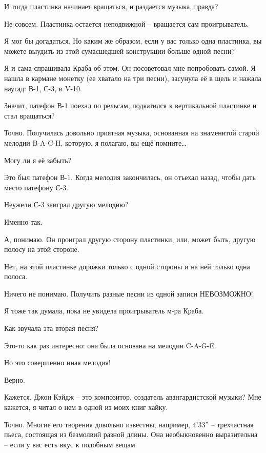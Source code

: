\documentclass[../main.tex]{subfiles}
\begin{document}
\begin{Dialogue}
 И тогда пластинка начинает вращаться, и раздается музыка, правда?

 Не совсем. Пластинка остается неподвижной \--- вращается сам проигрыватель.

 Я мог бы догадаться. Но каким же образом, если у вас только одна пластинка, вы можете выудить из этой сумасшедшей конструкции больше одной песни?

 Я и сама спрашивала Краба об этом. Он посоветовал мне попробовать самой. Я нашла в кармане монетку (ее хватало на три песни), засунула её в щель и нажала наугад: В-1, С-3, и V-10.

 Значит, патефон В-1 поехал по рельсам, подкатился к вертикальной пластинке и стал вращаться?

 Точно. Получилась довольно приятная музыка, основанная на знаменитой старой мелодии \mbox{B-A-C-H}, которую, я полагаю, вы ещё помните\ldots{}

 Могу ли я её забыть?

 Это был патефон В-1. Когда мелодия закончилась, он отъехал назад, чтобы дать место патефону С-3.

 Неужели С-3 заиграл другую мелодию?

 Именно так.

 А, понимаю. Он проиграл другую сторону пластинки, или, может быть, другую полосу на этой стороне.

 Нет, на этой пластинке дорожки только с одной стороны и на ней только одна полоса.

 Ничего не понимаю. Получить разные песни из одной записи НЕВОЗМОЖНО!

 Я тоже так думала, пока не увидела проигрыватель м-ра Краба.

 Как звучала эта вторая песня?

 Это-то как раз интересно: она была основана на мелодии \mbox{C-A-G-E}.

 Но это совершенно иная мелодия!

 Верно.

 Кажется, Джон Кэйдж \--- это композитор, создатель авангардистской музыки? Мне кажется, я читал о нем в одной из моих книг хайку.

 Точно. Многие его творения довольно известны, например, 4'33'' \--- трехчастная пьеса, состоящая из безмолвий разной длины. Она необыкновенно выразительна \--- если у вас есть вкус к подобным вещам.


\end{Dialogue}
\end{document}
